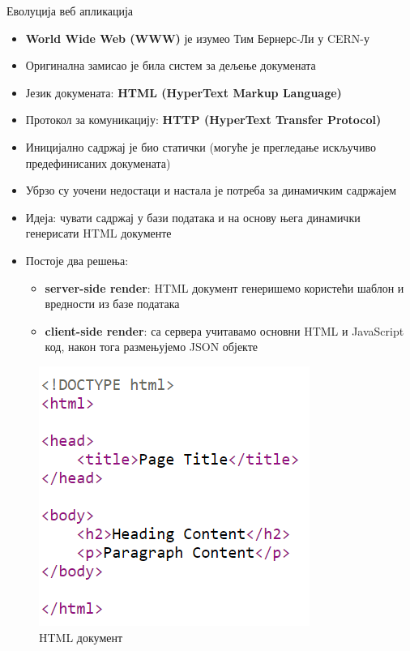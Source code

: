 \documentclass{beamer}
\begin{document}
    \begin{frame}[allowframebreaks]{Еволуција веб апликација}
        \begin{itemize}
            \item \textbf{World Wide Web (WWW)} је изумео Тим Бернерс-Ли у CERN-у
            \item Оригинална замисао је била систем за дељење докумената
            \item Језик докумената: \textbf{HTML (HyperText Markup Language)}
            \item Протокол за комуникацију: \textbf{HTTP (HyperText Transfer Protocol)}
            \item Иницијално садржај је био статички (могуће је прегледање искључиво предефинисаних докумената)
            \item Убрзо су уочени недостаци и настала је потреба за динамичким садржајем
        \end{itemize}
        
        \framebreak
        
        \begin{itemize}
            \item Идеја: чувати садржај у бази података и на основу њега динамички генерисати HTML документе
            \item Постоје два решења:
            \begin{itemize}
                \item \textbf{server-side render}: HTML документ генеришемо користећи шаблон и вредности из базе података
                \item \textbf{client-side render}: са сервера учитавамо основни HTML и JavaScript код, након тога размењујемо JSON објекте
            \end{itemize}
        \end{itemize}
        
        \framebreak
        
        \begin{figure}
            \centering
            \includegraphics[height=\dimexpr \textheight - 4\baselineskip\relax]{images/html.png}
            \caption{HTML документ}
            \label{fig:html}
        \end{figure}
        

\end{frame}
\end{document}
